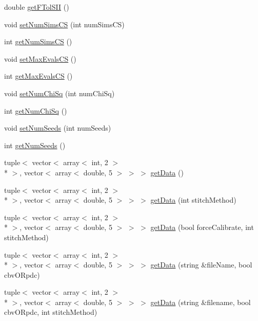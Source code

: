 \begin{DoxyCompactItemize}
\item 
double \hyperlink{class_kepler_obj_acbf137e5718db7b15f72c91fa4d2f726}{get\-F\-Tol\-S\-I\-I} ()
\item 
void \hyperlink{class_kepler_obj_a78ddbc7c63e7d698e968a65d04ed5ae1}{set\-Num\-Sims\-C\-S} (int num\-Sims\-C\-S)
\item 
int \hyperlink{class_kepler_obj_a70fe38e2ebdfda98be4284f00e6c4734}{get\-Num\-Sims\-C\-S} ()
\item 
void \hyperlink{class_kepler_obj_a00f426d160b0674bfe52d2f36014e465}{set\-Max\-Evals\-C\-S} ()
\item 
int \hyperlink{class_kepler_obj_adda2765461c9fe80a8427f39b8f841ed}{get\-Max\-Evals\-C\-S} ()
\item 
void \hyperlink{class_kepler_obj_a94b23d5f4fe9142053e2c0a8d5a7eab4}{set\-Num\-Chi\-Sq} (int num\-Chi\-Sq)
\item 
int \hyperlink{class_kepler_obj_a7c4abbe2e792cff003d957d9b631dc74}{get\-Num\-Chi\-Sq} ()
\item 
void \hyperlink{class_kepler_obj_afaefc71cee5ab1f7fed60366910b77d2}{set\-Num\-Seeds} (int num\-Seeds)
\item 
int \hyperlink{class_kepler_obj_aff16c04462b1714a474a1c2bb3be30ff}{get\-Num\-Seeds} ()
\item 
tuple$<$ vector$<$ array$<$ int, 2 $>$\\*
 $>$, vector$<$ array$<$ double, 5 $>$ $>$ $>$ \hyperlink{class_kepler_obj_a9162e912a70706492323c4a7b84e25a7}{get\-Data} ()
\item 
tuple$<$ vector$<$ array$<$ int, 2 $>$\\*
 $>$, vector$<$ array$<$ double, 5 $>$ $>$ $>$ \hyperlink{class_kepler_obj_ac372c45b9df44b41192324c50629dd92}{get\-Data} (int stitch\-Method)
\item 
tuple$<$ vector$<$ array$<$ int, 2 $>$\\*
 $>$, vector$<$ array$<$ double, 5 $>$ $>$ $>$ \hyperlink{class_kepler_obj_acb2e980082a9a943dbecb40cf4dcd0bb}{get\-Data} (bool force\-Calibrate, int stitch\-Method)
\item 
tuple$<$ vector$<$ array$<$ int, 2 $>$\\*
 $>$, vector$<$ array$<$ double, 5 $>$ $>$ $>$ \hyperlink{class_kepler_obj_a3f09ad774ae8ffad8936ff1c2f91bcbb}{get\-Data} (string \&file\-Name, bool cbv\-O\-Rpdc)
\item 
tuple$<$ vector$<$ array$<$ int, 2 $>$\\*
 $>$, vector$<$ array$<$ double, 5 $>$ $>$ $>$ \hyperlink{class_kepler_obj_af0c74aa514da769c45ddd1b5d6fa09d8}{get\-Data} (string \&filename, bool cbv\-O\-Rpdc, int stitch\-Method)

\end{DoxyCompactItemize}
